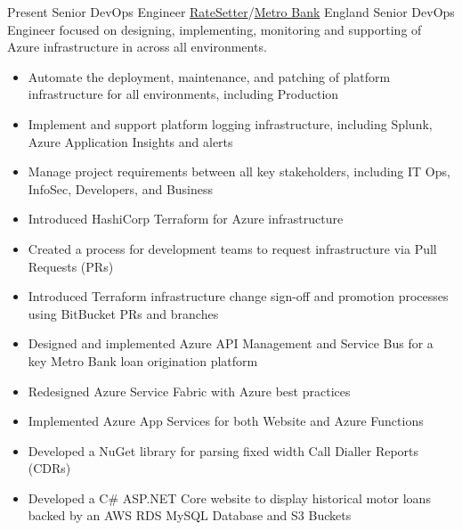 
\begin{twenty}
  {Present}
  {Senior DevOps Engineer}
  {\href{https://www.ratesetter.com/}{RateSetter}/\href{https://metrobankonline.co.uk}{Metro Bank}}
  {England}
  {Senior DevOps Engineer focused on designing, implementing, monitoring and supporting of Azure infrastructure in across all environments.}
  {\begin{itemize}
    \item Automate the deployment, maintenance, and patching of platform infrastructure for all environments, including Production
    \item Implement and support platform logging infrastructure, including Splunk, Azure Application Insights and alerts
    \item Manage project requirements between all key stakeholders, including IT Ops, InfoSec, Developers, and Business
  \end{itemize}}
  {\begin{itemize}
    \item Introduced HashiCorp Terraform for Azure infrastructure
    \item Created a process for development teams to request infrastructure via Pull Requests (PRs)
    \item Introduced Terraform infrastructure change sign-off and promotion processes using BitBucket PRs and branches
    \item Designed and implemented Azure API Management and Service Bus for a key Metro Bank loan origination platform
    \item Redesigned Azure Service Fabric with Azure best practices
    \item Implemented Azure App Services for both Website and Azure Functions
    \item Developed a NuGet library for parsing fixed width Call Dialler Reports (CDRs)
    \item Developed a C\# ASP.NET Core website to display historical motor loans backed by an AWS RDS MySQL Database and S3 Buckets
  \end{itemize}
  }
\end{twenty}

